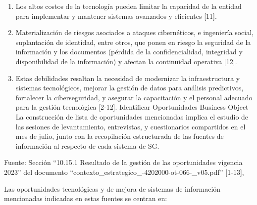 \documentclass[
	a4paper, %
	12pt, %
]{include/CSSullivanBusinessReport}
\begin{document}
\begin{enumerate}
  Obsolescencia tecnológica que implica la necesidad de renovación de
  los equipos y dificulta la prestación de los servicios de la entidad
  {[}11{]}.
\item
  Los altos costos de la tecnología pueden limitar la capacidad de la
  entidad para implementar y mantener sistemas avanzados y eficientes
  {[}11{]}.
\item
  Materialización de riesgos asociados a ataques cibernéticos, e
  ingeniería social, suplantación de identidad, entre otros, que ponen
  en riesgo la seguridad de la información y los documentos (pérdida de
  la confidencialidad, integridad y disponibilidad de la información) y
  afectan la continuidad operativa {[}12{]}.
\item
  Estas debilidades resaltan la necesidad de modernizar la
  infraestructura y sistemas tecnológicos, mejorar la gestión de datos
  para análisis predictivos, fortalecer la ciberseguridad, y asegurar la
  capacitación y el personal adecuado para la gestión tecnológica
  {[}2-12{]}. \textbar{} \textbar{} Identificar Oportunidades \textbar{}
  Business Object \textbar{} La construcción de lista de oportunidades
  mencionadas implica el estudio de las sesiones de levantamiento,
  entrevistas, y cuestionarios compartidos en el mes de julio, junto con
  la recopilación estructurada de las fuentes de información al respecto
  de cada sistema de SG.
\end{enumerate}

Fuente: Sección ``10.15.1 Resultado de la gestión de las oportunidades
vigencia 2023'' del documento
``contexto\_estrategico\_-4202000-ot-066-\_v05.pdf'' {[}1-13{]},

Las oportunidades tecnológicas y de mejora de sistemas de información
mencionadas indicadas en estas fuentes se centran en:
\end{document}
